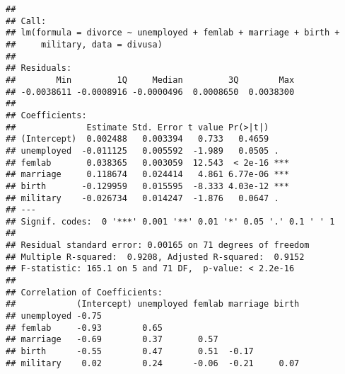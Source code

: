 \documentclass[
]{article}
\newenvironment{Shaded}{\begin{snugshade}}{\end{snugshade}}
\newcommand{\AttributeTok}[1]{\textcolor[rgb]{0.77,0.63,0.00}{#1}}
\newcommand{\CommentTok}[1]{\textcolor[rgb]{0.56,0.35,0.01}{\textit{#1}}}
\newcommand{\ConstantTok}[1]{\textcolor[rgb]{0.00,0.00,0.00}{#1}}
\newcommand{\DecValTok}[1]{\textcolor[rgb]{0.00,0.00,0.81}{#1}}
\newcommand{\FunctionTok}[1]{\textcolor[rgb]{0.00,0.00,0.00}{#1}}
\newcommand{\NormalTok}[1]{#1}
\newcommand{\OtherTok}[1]{\textcolor[rgb]{0.56,0.35,0.01}{#1}}
\newcommand{\SpecialCharTok}[1]{\textcolor[rgb]{0.00,0.00,0.00}{#1}}
\newcommand{\StringTok}[1]{\textcolor[rgb]{0.31,0.60,0.02}{#1}}
\begin{document}
\begin{verbatim}
## 
## Call:
## lm(formula = divorce ~ unemployed + femlab + marriage + birth + 
##     military, data = divusa)
## 
## Residuals:
##        Min         1Q     Median         3Q        Max 
## -0.0038611 -0.0008916 -0.0000496  0.0008650  0.0038300 
## 
## Coefficients:
##              Estimate Std. Error t value Pr(>|t|)    
## (Intercept)  0.002488   0.003394   0.733   0.4659    
## unemployed  -0.011125   0.005592  -1.989   0.0505 .  
## femlab       0.038365   0.003059  12.543  < 2e-16 ***
## marriage     0.118674   0.024414   4.861 6.77e-06 ***
## birth       -0.129959   0.015595  -8.333 4.03e-12 ***
## military    -0.026734   0.014247  -1.876   0.0647 .  
## ---
## Signif. codes:  0 '***' 0.001 '**' 0.01 '*' 0.05 '.' 0.1 ' ' 1
## 
## Residual standard error: 0.00165 on 71 degrees of freedom
## Multiple R-squared:  0.9208, Adjusted R-squared:  0.9152 
## F-statistic: 165.1 on 5 and 71 DF,  p-value: < 2.2e-16
## 
## Correlation of Coefficients:
##            (Intercept) unemployed femlab marriage birth
## unemployed -0.75                                       
## femlab     -0.93        0.65                           
## marriage   -0.69        0.37       0.57                
## birth      -0.55        0.47       0.51  -0.17         
## military    0.02        0.24      -0.06  -0.21     0.07
\end{verbatim}

\begin{Shaded}
\end{Shaded}
\end{document}
